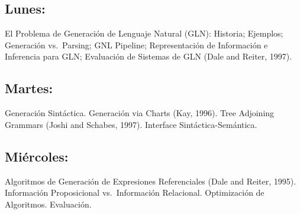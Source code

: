 \documentclass[a4paper]{article}
\begin{document}
\subsection*{Lunes:} El Problema de Generaci\'on de Lenguaje Natural (GLN): Historia; Ejemplos; Generaci\'on vs.\ Parsing; GNL Pipeline; Representaci\'on de Informaci\'on e Inferencia para GLN; Evaluaci\'on de Sistemas de GLN (Dale and Reiter, 1997).

\subsection*{Martes:} Generaci\'on Sint\'actica. Generaci\'on via Charts (Kay, 1996). Tree Adjoining Grammars (Joshi and Schabes, 1997). Interface Sint\'actica-Sem\'antica.

\subsection*{Mi\'ercoles:} Algoritmos de Generaci\'on de Expresiones Referenciales (Dale and Reiter, 1995). Informaci\'on Proposicional vs.\ Informaci\'on Relacional. Optimizaci\'on de Algoritmos. Evaluaci\'on.
\end{document}
